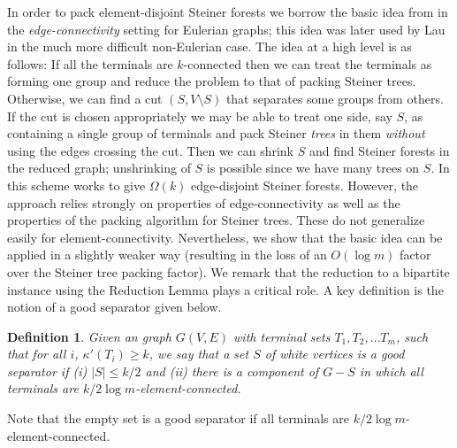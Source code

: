 \documentclass[11pt]{article}
\newtheorem{definition}[lemma]{Definition}
\newcommand{\elconn}{\kappa'}
\begin{document}
In order to pack element-disjoint Steiner forests we borrow the basic
idea from \cite{ChekuriS} in the {\em edge-connectivity} setting for
Eulerian graphs; this idea was later used by Lau \cite{Lau2} in the
much more difficult non-Eulerian case. The idea at a high level is as
follows: If all the terminals are $k$-connected then we can treat the
terminals as forming one group and reduce the problem to that of
packing Steiner trees. Otherwise, we can find a cut $(S, V\setminus
S)$ that separates some groups from others. If the cut is chosen
appropriately we may be able to treat one side, say $S$, as containing
a single group of terminals and pack Steiner {\em trees} in them {\em
  without} using the edges crossing the cut. Then we can shrink $S$
and find Steiner forests in the reduced graph; unshrinking of $S$ is
possible since we have many trees on $S$. In \cite{ChekuriS,Lau2} this
scheme works to give $\Omega(k)$ edge-disjoint Steiner forests.
However, the approach relies strongly on properties of
edge-connectivity as well as the properties of the packing algorithm
for Steiner trees. These do not generalize easily for
element-connectivity. Nevertheless, we show that the basic idea can be
applied in a slightly weaker way (resulting in the loss of an $O(\log
m)$ factor over the Steiner tree packing factor). We remark that the
reduction to a bipartite instance using the Reduction Lemma plays a
critical role. A key definition is the notion of a good separator
given below.

\begin{definition}
  Given an graph $G(V,E)$ with terminal sets $T_1, T_2, \ldots T_m$,
  such that for all $i$, $\elconn(T_i) \ge k$, we say that a set $S$
  of white vertices is a \emph{good separator} if (i) $|S| \le k/2$
  and (ii) there is a component of $G - S$ in which all terminals are
  $k/2 \log m$-element-connected.
\end{definition}

Note that the empty set is a good separator if all terminals are $k/2
\log m$-element-connected. 
\end{document}

